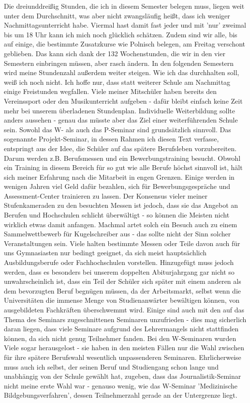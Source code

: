 \documentclass[a4paper,12pt,oneside]{scrbook}
\begin{document}
Die dreiunddreißig Stunden, die ich in diesem Semester belegen muss, liegen weit unter dem Durchschnitt, was aber nicht zwangsläufig heißt, dass ich weniger Nachmittagsunterricht habe. Viermal hast damit fast jeder und mit 'nur' zweimal bis um 18 Uhr kann ich mich noch glücklich schätzen. Zudem sind wir alle, bis auf einige, die bestimmte Zusatzkurse wie Polnisch belegen, am Freitag verschont geblieben. Das kann sich dank der 132 Wochenstunden, die wir in den vier Semestern einbringen müssen, aber rasch ändern. In den folgenden Semestern wird meine Stundenzahl außerdem weiter steigen. Wie ich das durchhalten soll, weiß ich noch nicht. Ich hoffe nur, dass statt weiterer Schule am Nachmittag einige Freistunden wegfallen.
Viele meiner Mitschüler haben bereits den Vereinssport oder den Musikunterricht aufgeben - dafür bleibt einfach keine Zeit mehr bei unserem überladenen Stundenplan. Individuelle Weiterbildung sollte anders aussehen - genau das müsste aber das Ziel einer weiterführenden Schule sein.
Sowohl das W- als auch das P-Seminar sind grundsätzlich sinnvoll. Das sogenannte Projekt-Seminar, in dessen Rahmen ich diesen Text verfasse, entspringt aus der Idee, die Schüler auf das spätere Berufsleben vorzubereiten. Darum werden z.B. Berufsmessen und ein Bewerbungstraining besucht. Obwohl ein Training in diesem Bereich für so gut wie alle Berufe höchst sinnvoll ist, hält sich meiner Erfahrung nach die Mitarbeit in engen Grenzen. Einige werden in wenigen Jahren viel Geld dafür bezahlen, sich für Bewerbungsgespräche und Assessment-Center trainieren zu lassen. Der Konsensus vieler meiner Stufenkameraden zu den besuchten Messen ist jedoch, dass sie das Angebot an Berufen und Hochschulen schlicht überwältigt - so können die Meisten nicht wirklich etwas damit anfangen. Machmal artet solch ein Besuch auch zu einem Sammelwettbewerb für Kugelschreiber aus - das sollte nicht der Sinn solcher Veranstaltungen sein. Viele halten bestimmte Messen oder Teile davon auch für uns Gymnasiasten nur bedingt geeignet, da sich meist hauptsächlich Ausbildungsberufe oder Fachhochschulen vorstellen. Hinzugefügt muss jedoch werden, dass es besonders bei unserem doppelten Abiturjahrgang gar nicht so unwahrscheinlich ist, dass ein Teil der Schüler sich später mit einem anderen als dem bevorzugten Beruf begnügen müssen, da der Arbeitsmarkt, selbst wenn die Universitäten die immense Menge von Studienanwärter bewältigen können, von ausgebildeten Fachkräften überschwemmt wird. Einige sind auch mit den auf das Thema des Seminars zugeschnittenen Seminaren unzufrieden - dies mag sicherlich daran liegen, dass viele Seminare aufgrund des Lehrermangels nicht stattfinden können, da sich nicht genug Teilnehmer fanden. Bei den W-Seminaren wurden Viele sogar herausgelost - sie haben in den meisten Fällen nur die Wahl zwischen für ihre spätere Berufswahl wesentlich unpassenderen Seminaren. Ehrlicherweise muss auch ich selbst, der seinen Beruf und Studiengang schon lange und unabhängig von der Schule gewählt hat, zugeben, dass das Journalistik-Seminar nicht meine erste Wahl war - genauso wenig, wie das W-Seminar 'Medizinische Bildgebungsverfahren', dessen Teilnehmerzahl gerade an der Untergrenze liegt.
\end{document}
